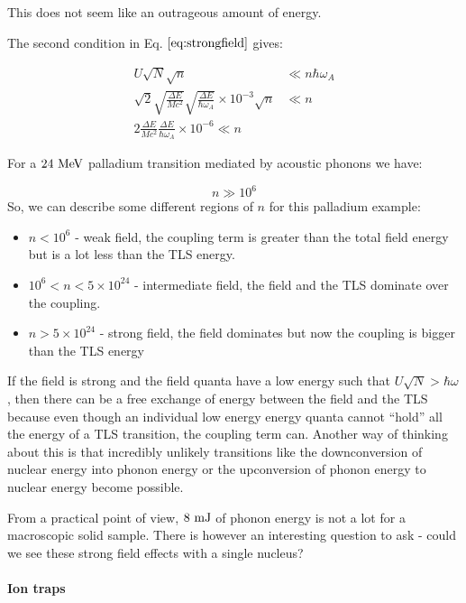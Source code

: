 \documentclass[
]{article}
\renewcommand{\[}{\begin{equation}}
\renewcommand{\]}{\end{equation}}
\providecommand{\tightlist}{%
  \setlength{\itemsep}{0pt}\setlength{\parskip}{0pt}}
\begin{document}
This does not seem like an outrageous amount of energy.

The second condition in Eq. \(\ref{eq:strongfield}\) gives:

\[
\begin{aligned}
U\sqrt{N}\sqrt{n} &\ll  n\hbar \omega_A \\
\sqrt{2} \sqrt{\frac{\Delta E}{M c^2}} \sqrt{\frac{\Delta E}{\hbar \omega_A}} \times 10^{-3}\sqrt{n} &\ll n \\
2\frac{\Delta E}{M c^2} \frac{\Delta E}{\hbar \omega_A} \times 10^{-6} \ll n
\end{aligned}
\]

For a \(\rm 24 \ MeV\) palladium transition mediated by acoustic phonons
we have:

\[
n \gg 10^{6}
\] So, we can describe some different regions of \(n\) for this
palladium example:

\begin{itemize}
\tightlist
\item
  \(n<10^{6}\) - weak field, the coupling term is greater than the total
  field energy but is a lot less than the TLS energy.
\item
  \(10^6 < n < 5 \times 10^{24}\) - intermediate field, the field and
  the TLS dominate over the coupling.
\item
  \(n > 5\times 10^{24}\) - strong field, the field dominates but now
  the coupling is bigger than the TLS energy
\end{itemize}

If the field is strong and the field quanta have a low energy such that
\(U\sqrt{N}>\hbar\omega\), then there can be a free exchange of energy
between the field and the TLS because even though an individual low
energy energy quanta cannot ``hold'' all the energy of a TLS transition,
the coupling term can. Another way of thinking about this is that
incredibly unlikely transitions like the downconversion of nuclear
energy into phonon energy or the upconversion of phonon energy to
nuclear energy become possible.

From a practical point of view, \(8  \rm \ mJ\) of phonon energy is not
a lot for a macroscopic solid sample. There is however an interesting
question to ask - could we see these strong field effects with a single
nucleus?

\paragraph{Ion traps}\label{ion-traps}
\end{document}

